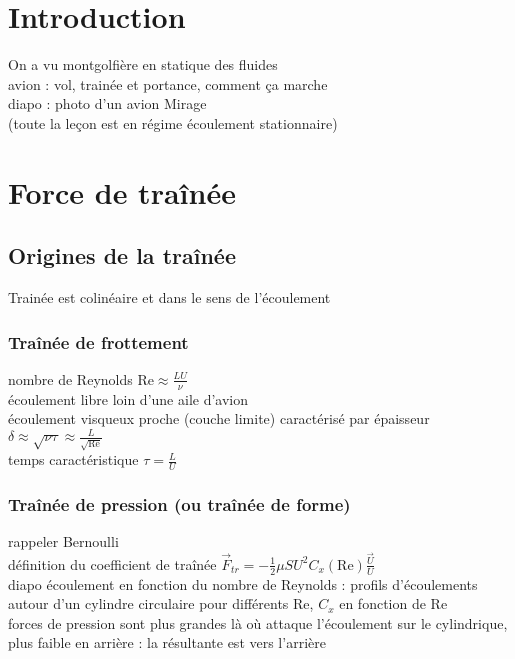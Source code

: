 


\biblio{}

\section*{Introduction}
On a vu montgolfière en statique des fluides \\
avion : vol, trainée et portance, comment ça marche \\
diapo : photo d'un avion Mirage \\
(toute la leçon est en régime écoulement stationnaire) \\

\section{Force de traînée}
\subsection{Origines de la traînée}
Trainée est colinéaire et dans le sens de l'écoulement \\
\subsubsection*{Traînée de frottement} 
nombre de Reynolds $\mathrm{Re} \approx \frac{LU}{\nu}$ \\
écoulement libre loin d'une aile d'avion \\
écoulement visqueux proche (couche limite) caractérisé par épaisseur $\delta \approx \sqrt{\nu \tau} \approx \frac{L}{\sqrt{\mathrm{Re}}}$  \\
temps caractéristique $\tau=\frac{L}{U}$\\

\subsubsection*{Traînée de pression (ou traînée de forme)}
rappeler Bernoulli \\
définition du coefficient de traînée $\vec{F}_{tr}=-\frac{1}{2} \mu S U^2 C_x \left( \mathrm{Re} \right) \frac{\vec{U}}{U}$ \\
diapo écoulement en fonction du nombre de Reynolds : profils d'écoulements autour d'un cylindre circulaire pour différents $\mathrm{Re}$, $C_x$ en fonction de $\mathrm{Re}$ \\
forces de pression sont plus grandes là où attaque l'écoulement sur le cylindrique, plus faible en arrière : la résultante est vers l'arrière \\

